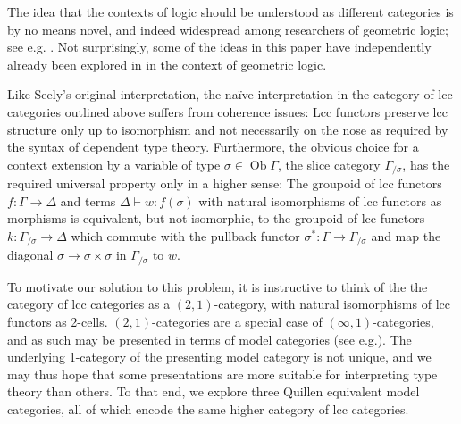 \documentclass[a4paper]{article}
\theoremstyle{remark}
\theoremstyle{definition}
\begin{document}
The idea that the contexts of logic should be understood as different categories is by no means novel, and indeed widespread among researchers of geometric logic; see e.g. \cite[section 4.5]{locales-and-toposes-as-spaces}.
Not surprisingly, some of the ideas in this paper have independently already been explored in \cite{au-sketches} in the context of geometric logic.

Like Seely's original interpretation, the naïve interpretation in the category of lcc categories outlined above suffers from coherence issues:
Lcc functors preserve lcc structure only up to isomorphism and not necessarily on the nose as required by the syntax of dependent type theory.
Furthermore, the obvious choice for a context extension by a variable of type $\sigma \in \operatorname{Ob} \Gamma$, the slice category $\Gamma_{/ \sigma}$, has the required universal property only in a higher sense:
The groupoid of lcc functors $f : \Gamma \rightarrow \Delta$ and terms $\Delta \vdash w : f(\sigma)$ with natural isomorphisms of lcc functors as morphisms is equivalent, but not isomorphic, to the groupoid of lcc functors $k : \Gamma_{/ \sigma} \rightarrow \Delta$ which commute with the pullback functor $\sigma^* : \Gamma \rightarrow \Gamma_{/ \sigma}$ and map the diagonal $\sigma \rightarrow \sigma \times \sigma$ in $\Gamma_{/ \sigma}$ to $w$.

To motivate our solution to this problem, it is instructive to think of the the category of lcc categories as a $(2, 1)$-category, with natural isomorphisms of lcc functors as 2-cells.
$(2, 1)$-categories are a special case of $(\infty, 1)$-categories, and as such may be presented in terms of model categories (see e.g.\@ \cite{hirschhorn}).
The underlying 1-category of the presenting model category is not unique, and we may thus hope that some presentations are more suitable for interpreting type theory than others.
To that end, we explore three Quillen equivalent model categories, all of which encode the same higher category of lcc categories.
\end{document}
